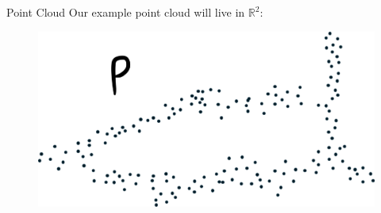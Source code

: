 \documentclass{beamer}
\begin{document}
\begin{frame}{Point Cloud}
  Our example point cloud will live in $\mathbb{R}^2$:
  \begin{figure}
    \includegraphics[width=1\textwidth]{pointcloud.png}
  \end{figure}
\end{frame}
\end{document}
